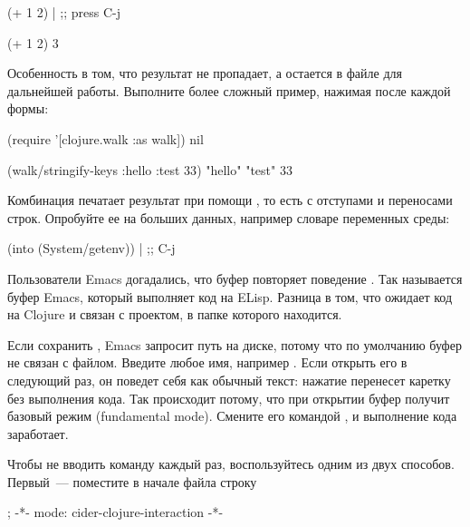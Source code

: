 \begin{english}
  \begin{clojure}
(+ 1 2) | ;; press C-j

(+ 1 2)
3
  \end{clojure}
\end{english}

Особенность  в том, что результат не пропадает, а остается в файле для дальнейшей работы. Выполните более сложный пример, нажимая  после каждой формы:

\begin{english}
  \begin{clojure}
(require '[clojure.walk :as walk])
nil

(walk/stringify-keys {:hello {:test 33}})
{"hello" {"test" 33}}
  \end{clojure}
\end{english}

Комбинация  печатает результат при помощи , то есть с отступами и переносами строк. Опробуйте ее на больших данных, например словаре переменных среды:

\begin{english}
  \begin{clojure}
(into {} (System/getenv)) | ;; C-j
  \end{clojure}
\end{english}

Пользователи Emacs догадались, что буфер  повторяет поведение . Так называется буфер Emacs, который выполняет код на ELisp. Разница в том, что  ожидает код на Clojure и связан с проектом, в папке которого находится.

Если сохранить , Emacs запросит путь на диске, потому что по умолчанию буфер не связан с файлом. Введите любое имя, например . Если открыть его в следующий раз, он поведет себя как обычный текст: нажатие  перенесет каретку без выполнения кода. Так происходит потому, что при открытии буфер получит базовый режим (fundamental mode). Смените его командой , и выполнение кода заработает.

Чтобы не вводить команду каждый раз, воспользуйтесь одним из двух способов. Первый~--- поместите в начале файла строку

\begin{english}
  \begin{text}
; -*- mode: cider-clojure-interaction -*-
  \end{text}
\end{english}

